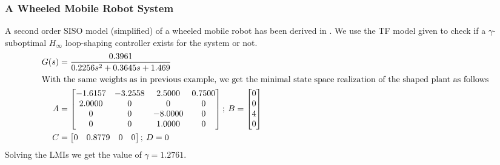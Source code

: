 \documentclass[a4paper,12pt]{article}
\begin{document}
	 \subsubsection{A Wheeled Mobile Robot System}
	 A second order SISO model (simplified) of a wheeled mobile robot has been derived in \cite{robot}. We use the TF model given to check if a $\gamma$-suboptimal $H_{\infty}$ loop-shaping controller exists for the system or not. 
	 \begin{align}
	 G(s)&=\frac{0.3961}{0.2256s^{2} + 0.3645s + 1.469} \\
	 \intertext{With the same weights as in previous example, we get the minimal state space realization of the shaped plant as follows}
	 A &=
\begin{bmatrix}
   -1.6157  & -3.2558  &  2.5000   & 0.7500 \\
    2.0000     &    0   &      0    &     0\\
         0    &     0  & -8.0000   &      0\\
         0   &      0  &  1.0000  &       0
\end{bmatrix}; \:
B =
\begin{bmatrix}
     0\\
     0\\
     4\\
     0
\end{bmatrix}\\
C &=
\begin{bmatrix}
         0  &  0.8779       &  0       &  0
\end{bmatrix}; \:
D =     0
     \end{align}
     Solving the LMIs we get the value of $\gamma=1.2761$. 
\end{document}
